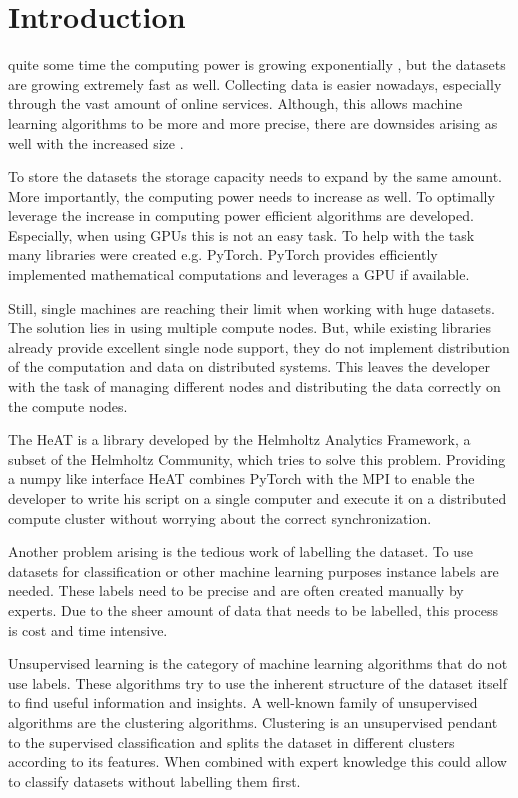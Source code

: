 
\section{Introduction}
\label{sec:intro}
  quite some time the computing power is growing exponentially \cite{moore_cramming_1998}, but the datasets are growing extremely fast as well.
Collecting data is easier nowadays, especially through the vast amount of online services.
Although, this allows machine learning algorithms to be more and more precise, there are downsides arising as well with
the increased size \cite{khan_big_2014}.

To store the datasets the storage capacity needs to expand by the same amount. More importantly, the computing power needs to increase
as well. To optimally leverage the increase in computing power efficient algorithms are developed.
Especially, when using \glspl{GPU} this is not an easy task. To help with the task many libraries were created e.g. PyTorch.
\gls{PyTorch} provides efficiently implemented mathematical computations and leverages a \gls{GPU} if available.

Still, single machines are reaching their limit when working with huge datasets. The solution lies in using multiple compute nodes.
But, while existing libraries already provide excellent single node support, they do not implement distribution of the computation and data on distributed systems.
This leaves the developer with the task of managing different nodes and distributing the data correctly on the compute nodes.

The \gls{HeAT} is a library developed by the Helmholtz Analytics Framework, a subset of the Helmholtz Community, which tries to solve this problem.
Providing a \gls{numpy} like interface \gls{HeAT} combines \gls{PyTorch} with the \gls{MPI} to enable the developer to write his script on a single computer
and execute it on a distributed compute cluster without worrying about the correct synchronization.

Another problem arising is the tedious work of labelling the dataset.
To use datasets for classification or other machine learning purposes instance labels are needed.
These labels need to be precise and are often created manually by experts.
Due to the sheer amount of data that needs to be labelled, this process is cost and time intensive.

Unsupervised learning is the category of machine learning algorithms that do not use labels. These algorithms try to
use the inherent structure of the dataset itself to find useful information and insights.
A well-known family of unsupervised algorithms are the clustering algorithms. Clustering is an unsupervised pendant to the supervised classification
and splits the dataset in different clusters according to its features.
When combined with expert knowledge this could allow to classify datasets without labelling them first.

